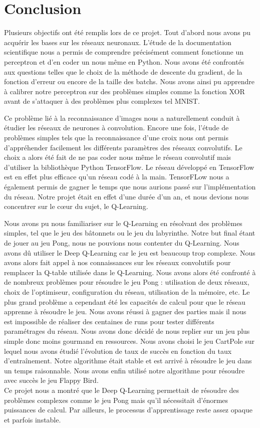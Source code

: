 \section*{Conclusion}

Plusieurs objectifs ont été remplis lors de ce projet. Tout d'abord nous avons pu acquérir les bases sur les réseaux neuronaux. L'étude de la documentation scientifique nous a permis de comprendre précisément comment fonctionne un perceptron et d'en coder un nous même en Python. Nous avons été confrontés aux questions telles que le choix de la méthode de descente du gradient, de la fonction d'erreur ou encore de la taille des batchs. Nous avons ainsi pu apprendre à calibrer notre perceptron sur des problèmes simples comme la fonction XOR avant de s'attaquer à des problèmes plus complexes tel MNIST.

Ce problème lié à la reconnaissance d'images nous a naturellement conduit à étudier les réseaux de neurones à convolution. Encore une fois, l'étude de problèmes simples tels que la reconnaissance d'une croix nous ont permis d'appréhender facilement les différents paramètres des réseaux convolutifs. Le choix a alors été fait de ne pas coder nous même le réseau convolutif mais d'utiliser la bibliothèque Python TensorFlow. Le réseau développé en TensorFlow est en effet plus efficace qu'un réseau codé à la main. TensorFLow nous a également permis de gagner le temps que nous aurions passé sur l'implémentation du réseau. Notre projet était en effet d'une durée d'un an, et nous devions nous concentrer sur le c\oe ur du sujet, le Q-Learning.

Nous avons pu nous familiariser sur le Q-Learning en résolvant des problèmes simples, tel que le jeu des bâtonnets ou le jeu du labyrinthe. Notre but final étant de jouer au jeu Pong, nous ne pouvions nous contenter du Q-Learning. Nous avons dû utiliser le Deep Q-Learning car le jeu est beaucoup trop complexe. Nous avons alors fait appel à nos connaissances sur les réseaux convolutifs pour remplacer la Q-table utilisée dans le Q-Learning. Nous avons alors été confronté à de nombreux problèmes pour résoudre le jeu Pong : utilisation de deux réseaux, choix de l'optimiseur, configuration du réseau, utilisation de la mémoire, etc. Le plus grand problème a cependant été les capacités de calcul pour que le réseau apprenne à résoudre le jeu. Nous avons réussi à gagner des parties mais il nous est impossible de réaliser des centaines de runs pour tester différents paramétrages du réseau. Nous avons donc décidé de nous replier sur un jeu plus simple donc moins gourmand en ressources. Nous avons choisi le jeu CartPole sur lequel nous avons étudié l'évolution de taux de succès en fonction du taux d'entraînement. Notre algorithme était stable et est arrivé à résoudre le jeu dans un temps raisonnable. Nous avons enfin utilisé notre algorithme pour résoudre avec succès le jeu Flappy Bird.
\\

Ce projet nous a montré que le Deep Q-Learning permettait de résoudre des problèmes complexes comme le jeu Pong mais qu'il nécessitait d'énormes puissances de calcul. Par ailleurs, le processus d'apprentissage reste assez opaque et parfois instable.